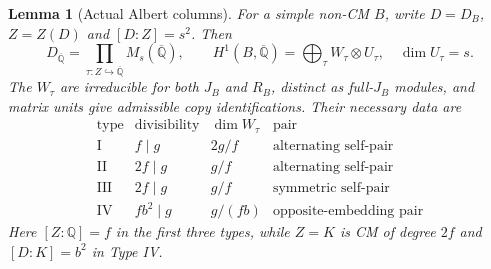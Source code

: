 \documentclass[11pt]{article}
\newcommand{\Q}{\mathbb Q}
\newcommand{\kk}{{\overline{\mathbb Q}}}
\newtheorem{lemma}[theorem]{Lemma}
\theoremstyle{remark}
\begin{document}
\begin{lemma}[Actual Albert columns]\label{lem:columns}
For a simple non-CM $B$, write $D=D_B$, $Z=Z(D)$ and $[D:Z]=s^2$.
Then
\[
 D_\kk=\prod_{\tau:Z\hookrightarrow\kk}M_s(\kk),\qquad
 H^1(B,\kk)=\bigoplus_\tau W_\tau\otimes U_\tau,\quad \dim U_\tau=s.
 \tag{4}\label{eq:columns}
\]
The $W_\tau$ are irreducible for both $J_B$ and $R_B$, distinct as
full-$J_B$ modules, and matrix units give admissible copy
identifications. Their necessary data are
\[
\begin{array}{c|c|c|c}
\text{type}&\text{divisibility}&\dim W_\tau&\text{pair}\\ \hline
\mathrm I&f\mid g&2g/f&\text{alternating self-pair}\\
\mathrm{II}&2f\mid g&g/f&\text{alternating self-pair}\\
\mathrm{III}&2f\mid g&g/f&\text{symmetric self-pair}\\
\mathrm{IV}&fb^2\mid g&g/(fb)&\text{opposite-embedding pair}
\end{array}
\tag{5}\label{eq:albert}
\]
Here $[Z:\Q]=f$ in the first three types, while $Z=K$ is CM of
degree $2f$ and $[D:K]=b^2$ in Type IV.
\end{lemma}
\end{document}
